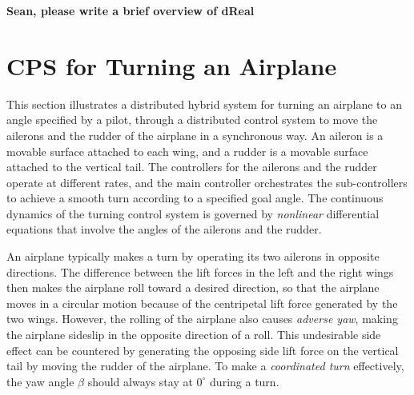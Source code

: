 \documentclass{sig-alternate}
\begin{document}
\textbf{Sean, please write a brief overview of dReal}
\newpage


\section{CPS for Turning an Airplane}

This section illustrates a distributed hybrid system
for turning an airplane to an angle specified by a pilot,
through a distributed control system to move the ailerons and the rudder 
of the airplane
in a synchronous way.
An aileron is a movable surface attached to  each wing, and a rudder is a movable surface attached to the vertical tail.
%
The controllers 
for the ailerons and the rudder operate at different rates,
and the main controller orchestrates the sub-controllers 
to achieve a smooth turn
according to a specified goal angle.
%
The continuous dynamics of the turning control system
is governed by \emph{nonlinear} differential equations
that involve the angles of the ailerons and the rudder.




An airplane typically makes a turn by operating its two ailerons in opposite directions.
The difference between the lift forces in the left and the right wings
then makes the airplane roll toward a desired direction, 
so that the airplane moves in a circular motion 
because of  the centripetal lift force 
generated by the two wings.
However, the rolling of the airplane also causes
\emph{adverse yaw}, making the airplane sideslip in the opposite direction of a roll.
This undesirable side effect can be countered by 
generating the opposing side lift force on the vertical tail
by moving the rudder of the airplane.
To make a \emph{coordinated turn} effectively, the yaw angle $\beta$ should
always stay at $0^\circ$
during a turn.
\end{document}
